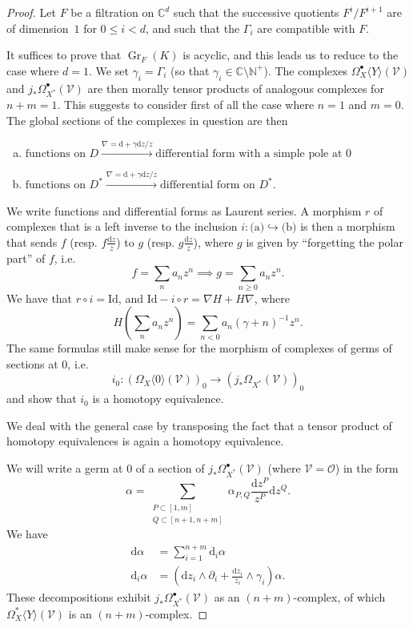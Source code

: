 \documentclass{report}
\renewcommand{\cal}[1]{{\mathcal{#1}}}
\newcommand{\id}{\mathrm{Id}}
\newcommand{\CC}{\mathbb{C}}
\newcommand{\NN}{\mathbb{N}}
\newcommand{\dd}{\mathrm{d}}
\renewcommand{\geq}{\geqslant}
\renewcommand{\leq}{\leqslant}
\DeclareMathOperator{\Gr}{Gr}
\newcommand{\oldpage}[1]{\marginpar{\footnotesize$\Big\vert$ \textit{p.~#1}}}
\begin{document}
\begin{proof}
  Let $F$ be a filtration on $\CC^d$ such that the successive quotients $F^i/F^{i+1}$ are of dimension~$1$ for $0\leq i<d$, and such that the $\Gamma_i$ are compatible with $F$.

  It suffices to prove that $\Gr_F(K)$ is acyclic, and this leads us to reduce to the case where $d=1$.
  We set $\gamma_i=\Gamma_i$ (so that $\gamma_i\in\CC\setminus\NN^+$).
  The complexes $\Omega_X^\bullet\langle Y\rangle(\cal{V})$ and $j_*\Omega_{X^*}^\bullet(\cal{V})$ are then morally tensor products of analogous complexes for $n+m=1$.
  This suggests to consider first of all the case where $n=1$ and $m=0$.
  The global sections of the complexes in question are then
  \begin{enumerate}[(a)]
    \item $\mbox{functions on $D$}\xrightarrow{\nabla=\dd+\gamma\dd z/z}\mbox{differential form with a simple pole at $0$}$
    \item $\mbox{functions on $D^*$}\xrightarrow{\nabla=\dd+\gamma\dd z/z}\mbox{differential form on $D^*$}$.
  \end{enumerate}

  We write functions and differential forms as Laurent series.
  A morphism $r$ of complexes that is a left inverse to the inclusion $i\colon\mbox{(a)}\hookrightarrow\mbox{(b)}$ is then a morphism that sends $f$ (resp. $f\frac{\dd z}{z}$) to $g$ (resp. $g\frac{\dd z}{z}$), where $g$ is given by ``forgetting the polar part'' of $f$, i.e.
  \[
    f = \sum_n a_n z^n
    \implies
    g = \sum_{n\geq0} a_n z^n.
  \]
  We have that $r\circ i=\id$, and $\id-i\circ r=\nabla H+H\nabla$, where
  \[
    H\left(\sum_n a_n z^n\right)
    = \sum_{n<0} a_n(\gamma+n)^{-1}z^n.
  \]
  The same formulas still make sense for the morphism of complexes of germs of sections at $0$, i.e.
  \[
    i_0\colon \left(\Omega_X\langle0\rangle(\cal{V})\right)_0 \to \left(j_*\Omega_{X^*}(\cal{V})\right)_0
  \]
  and show that $i_0$ is a homotopy equivalence.

  We deal with the general case by transposing the fact that a tensor product of
\oldpage{104}
  homotopy equivalences is again a homotopy equivalence.

  We will write a germ at $0$ of a section of $j_*\Omega_{X^*}^\bullet(\cal{V})$ (where $\cal{V}=\cal{O}$) in the form
  \[
    \alpha = \sum_{\substack{P\subset[1,m]\\Q\subset[n+1,n+m]}} \alpha_{P,Q}\frac{\dd z^P}{z^P}\dd z^Q.
  \]
  We have
  \[
    \begin{aligned}
      \dd\alpha &= \sum_{i=1}^{n+m} \dd_i\alpha
    \\\dd_i\alpha &= \left(\dd z_i\wedge\partial_i + \frac{\dd z_i}{z_i}\wedge\gamma_i\right)\alpha.
    \end{aligned}
  \]
  These decompositions exhibit $j_*\Omega_{X^*}^\bullet(\cal{V})$ as an $(n+m)$-complex, of which $\Omega_X^*\langle Y\rangle(\cal{V})$ is an $(n+m)$-complex.


\end{proof}
\end{document}
